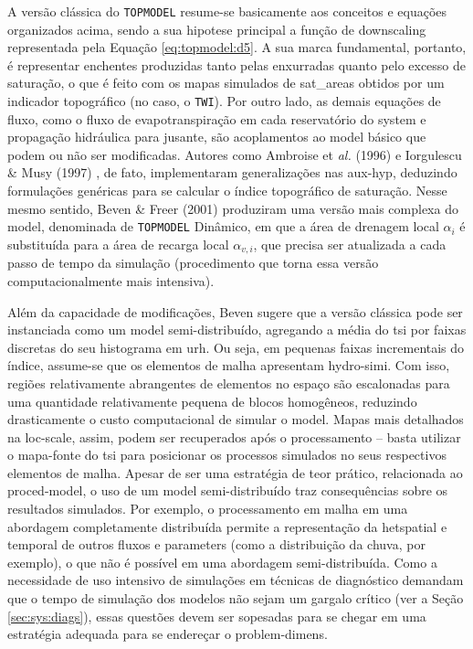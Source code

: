 \documentclass[./main.tex]{subfiles}
\begin{document}
\par A versão clássica do \texttt{TOPMODEL} resume-se basicamente aos conceitos e equações organizados acima, sendo a sua \gls{hipotese} principal a função de \gls{downscaling} representada pela Equação \eqref{eq:topmodel:d5}. A sua marca fundamental, portanto, é representar enchentes produzidas tanto pelas enxurradas quanto pelo excesso de saturação, o que é feito com os mapas simulados de \gls{sat_areas} obtidos por um indicador topográfico (no caso, o \texttt{TWI}). Por outro lado, as demais equações de fluxo, como o fluxo de evapotranspiração em cada reservatório do \gls{system} e propagação hidráulica para jusante, são acoplamentos ao \gls{model} básico que podem ou não ser modificadas. Autores como Ambroise et \textit{al.} (1996) \cite{Ambroise1996a} e Iorgulescu \& Musy (1997) \cite{Iorgulescu1997a}, de fato, implementaram generalizações nas \gls{aux-hyp}, deduzindo formulações genéricas para se calcular o índice topográfico de saturação. Nesse mesmo sentido, Beven \& Freer (2001) \cite{Beven2001b} produziram uma versão mais complexa do \gls{model}, denominada de \texttt{TOPMODEL} Dinâmico, em que a área de drenagem local $\alpha_i$ é substituída para a área de recarga local  $\alpha_{v, i}$, que precisa ser atualizada a cada passo de tempo da simulação (procedimento que torna essa versão computacionalmente mais intensiva).

\par Além da capacidade de modificações, Beven \cite{Beven2012} sugere que a versão clássica pode ser instanciada como um \gls{model} semi-distribuído, agregando a média do \gls{tsi} por faixas discretas do seu histograma em \gls{urh}. Ou seja, em pequenas faixas incrementais do índice, assume-se que os elementos de malha apresentam \gls{hydro-simi}. Com isso, regiões relativamente abrangentes de elementos no espaço são escalonadas para uma quantidade relativamente pequena de blocos homogêneos, reduzindo drasticamente o custo computacional de simular o \gls{model}. Mapas mais detalhados na \gls{loc-scale}, assim, podem ser recuperados após o processamento -- basta utilizar o mapa-fonte do \gls{tsi} para posicionar os processos simulados no seus respectivos elementos de malha. Apesar de ser uma estratégia de teor prático, relacionada ao \gls{proced-model}, o uso de um \gls{model} semi-distribuído traz consequências sobre os resultados simulados. Por exemplo, o processamento em malha em uma abordagem completamente distribuída permite a representação da \gls{hetspatial} e temporal de outros fluxos e \gls{parameters} (como a distribuição da chuva, por exemplo), o que não é possível em uma abordagem semi-distribuída. Como a necessidade de uso intensivo de simulações em técnicas de diagnóstico demandam que o tempo de simulação dos modelos não sejam um gargalo crítico (ver a Seção \ref{sec:sys:diags}), essas questões devem ser sopesadas para se chegar em uma estratégia adequada para se endereçar o \gls{problem-dimens}.
\end{document}
